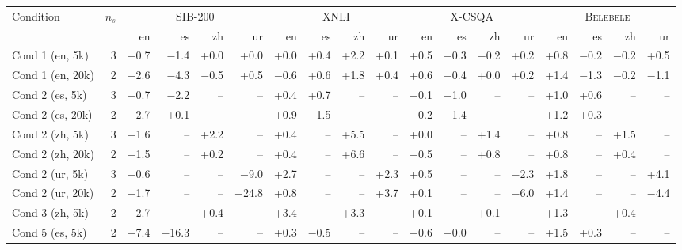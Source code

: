 \begin{table}[t]
  \centering
  \scriptsize
  \begin{tabular}{lrrrrrrrrrrrrrrrrr}
    \toprule
    Condition & $n_s$ & \multicolumn{4}{c}{\textsc{SIB-200}} & \multicolumn{4}{c}{\textsc{XNLI}} & \multicolumn{4}{c}{\textsc{X-CSQA}} & \multicolumn{4}{c}{\textsc{Belebele}} \\
    \cmidrule(lr){3-6} \cmidrule(lr){7-10} \cmidrule(lr){11-14} \cmidrule(lr){15-18}
     & & en & es & zh & ur & en & es & zh & ur & en & es & zh & ur & en & es & zh & ur \\
    \midrule
    Cond 1 (en, 5k) & 3 & $-$0.7 & $-$1.4 & +0.0 & +0.0 & +0.0 & +0.4 & +2.2 & +0.1 & +0.5 & +0.3 & $-$0.2 & +0.2 & +0.8 & $-$0.2 & $-$0.2 & +0.5 \\
    Cond 1 (en, 20k) & 2 & $-$2.6 & $-$4.3 & $-$0.5 & +0.5 & $-$0.6 & +0.6 & +1.8 & +0.4 & +0.6 & $-$0.4 & +0.0 & +0.2 & +1.4 & $-$1.3 & $-$0.2 & $-$1.1 \\
    Cond 2 (es, 5k) & 3 & $-$0.7 & $-$2.2 & -- & -- & +0.4 & +0.7 & -- & -- & $-$0.1 & +1.0 & -- & -- & +1.0 & +0.6 & -- & -- \\
    Cond 2 (es, 20k) & 2 & $-$2.7 & +0.1 & -- & -- & +0.9 & $-$1.5 & -- & -- & $-$0.2 & +1.4 & -- & -- & +1.2 & +0.3 & -- & -- \\
    Cond 2 (zh, 5k) & 3 & $-$1.6 & -- & +2.2 & -- & +0.4 & -- & +5.5 & -- & +0.0 & -- & +1.4 & -- & +0.8 & -- & +1.5 & -- \\
    Cond 2 (zh, 20k) & 2 & $-$1.5 & -- & +0.2 & -- & +0.4 & -- & +6.6 & -- & $-$0.5 & -- & +0.8 & -- & +0.8 & -- & +0.4 & -- \\
    Cond 2 (ur, 5k) & 3 & $-$0.6 & -- & -- & $-$9.0 & +2.7 & -- & -- & +2.3 & +0.5 & -- & -- & $-$2.3 & +1.8 & -- & -- & +4.1 \\
    Cond 2 (ur, 20k) & 2 & $-$1.7 & -- & -- & $-$24.8 & +0.8 & -- & -- & +3.7 & +0.1 & -- & -- & $-$6.0 & +1.4 & -- & -- & $-$4.4 \\
    Cond 3 (zh, 5k) & 2 & $-$2.7 & -- & +0.4 & -- & +3.4 & -- & +3.3 & -- & +0.1 & -- & +0.1 & -- & +1.3 & -- & +0.4 & -- \\
    Cond 5 (es, 5k) & 2 & $-$7.4 & $-$16.3 & -- & -- & +0.3 & $-$0.5 & -- & -- & $-$0.6 & +0.0 & -- & -- & +1.5 & +0.3 & -- & -- \\

\end{tabular}
\end{table}

